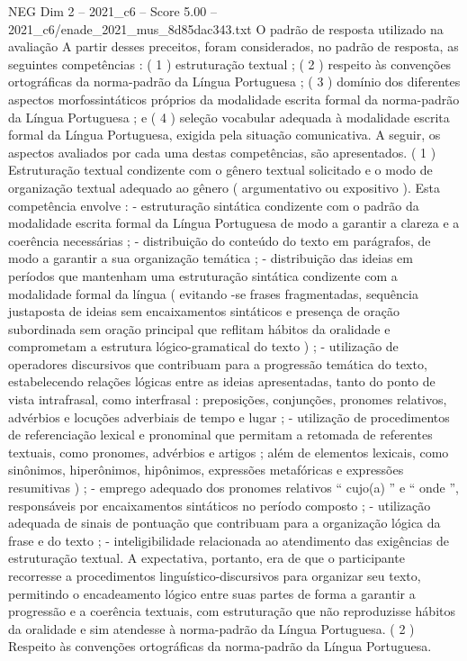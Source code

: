 \begin{textsample}{NEG Dim 2 – 2021\_c6 – Score 5.00 – 2021\_c6/enade\_2021\_mus\_8d85dac343.txt}
O padrão de resposta utilizado na avaliação A partir desses preceitos, foram considerados, no padrão de resposta, as seguintes competências : ( 1 ) estruturação textual ; ( 2 ) respeito às convenções ortográficas da norma-padrão da Língua Portuguesa ; ( 3 ) domínio dos diferentes aspectos morfossintáticos próprios da modalidade escrita formal da norma-padrão da Língua Portuguesa ; e ( 4 ) seleção vocabular adequada à modalidade escrita formal da Língua Portuguesa, exigida pela situação comunicativa.
A seguir, os aspectos avaliados por cada uma destas competências, são apresentados. ( 1 ) Estruturação textual condizente com o gênero textual solicitado e o modo de organização textual adequado ao gênero ( argumentativo ou expositivo ).
Esta competência envolve : - estruturação sintática condizente com o padrão da modalidade escrita formal da Língua Portuguesa de modo a garantir a clareza e a coerência necessárias ; - distribuição do conteúdo do texto em parágrafos, de modo a garantir a sua organização temática ; - distribuição das ideias em períodos que mantenham uma estruturação sintática condizente com a modalidade formal da língua ( evitando -se frases fragmentadas, sequência justaposta de ideias sem encaixamentos sintáticos e presença de oração subordinada sem oração principal que reflitam hábitos da oralidade e comprometam a estrutura lógico-gramatical do texto ) ; - utilização de operadores discursivos que contribuam para a progressão temática do texto, estabelecendo relações lógicas entre as ideias apresentadas, tanto do ponto de vista intrafrasal, como interfrasal : preposições, conjunções, pronomes relativos, advérbios e locuções adverbiais de tempo e lugar ; - utilização de procedimentos de referenciação lexical e pronominal que permitam a retomada de referentes textuais, como pronomes, advérbios e artigos ; além de elementos lexicais, como sinônimos, hiperônimos, hipônimos, expressões metafóricas e expressões resumitivas ) ; - emprego adequado dos pronomes relativos “ cujo(a) ” e “ onde ”, responsáveis por encaixamentos sintáticos no período composto ; - utilização adequada de sinais de pontuação que contribuam para a organização lógica da frase e do texto ; - inteligibilidade relacionada ao atendimento das exigências de estruturação textual.
A expectativa, portanto, era de que o participante recorresse a procedimentos linguístico-discursivos para organizar seu texto, permitindo o encadeamento lógico entre suas partes de forma a garantir a progressão e a coerência textuais, com estruturação que não reproduzisse hábitos da oralidade e sim atendesse à norma-padrão da Língua Portuguesa. ( 2 ) Respeito às convenções ortográficas da norma-padrão da Língua Portuguesa.

\end{textsample}

